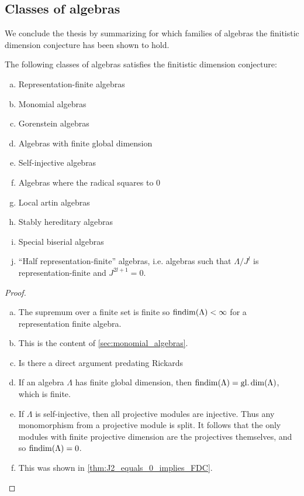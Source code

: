 \subsection{Classes of algebras}

We conclude the thesis by summarizing for which families of algebras the finitistic dimension conjecture has been shown to hold.

\begin{theorem}
	The following classes of algebras satisfies the finitistic dimension conjecture:
	\begin{enumerate}[a)]
		\item Representation-finite algebras
		\item Monomial algebras
		\item Gorenstein algebras
		\item Algebras with finite global dimension
		\item Self-injective algebras
		\item Algebras where the radical squares to 0
		\item Local artin algebras
		\item Stably hereditary algebras
		\item Special biserial algebras
		\item ``Half representation-finite'' algebras, i.e. algebras such that $\Lambda/J^l$ is representation-finite and $J^{2l+1}=0$.
	\end{enumerate}
	\begin{proof}
		\begin{enumerate}[a)]
			\item The supremum over a finite set is finite so $\operatorname{findim}(\Lambda) < \infty$ for a representation finite algebra.
			\item This is the content of \cref{sec:monomial_algebras}.
			\item Is there a direct argument predating Rickards
			\item If an algebra $\Lambda$ has finite global dimension, then $\operatorname{findim}(\Lambda) = \operatorname{gl.dim}(\Lambda)$, which is finite.
			\item If $\Lambda$ is self-injective, then all projective modules are injective. Thus any monomorphism from a projective module is split. It follows that the only modules with finite projective dimension are the projectives themselves, and so $\operatorname{findim}(\Lambda)=0$.
			\item This was shown in \cref{thm:J2_equals_0_implies_FDC}.

\end{enumerate}
\end{proof}
\end{theorem}
